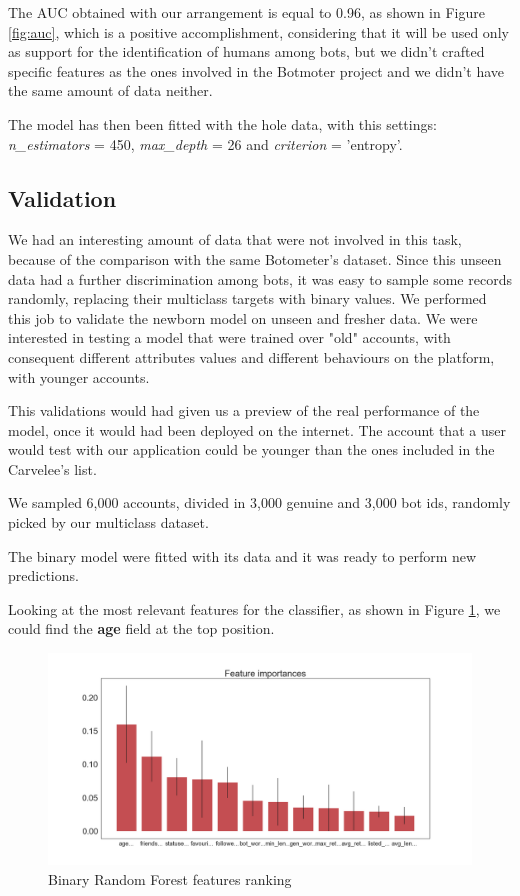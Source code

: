 The AUC obtained with our arrangement is equal to 0.96, as shown in Figure \ref{fig:auc}, which is a positive accomplishment, considering that it will be used only as support for the identification of humans among bots, but we didn't crafted specific features as the ones involved in the Botmoter project and we didn't have the same amount of data neither.

The model has then been fitted with the hole data, with this settings: \textit{ n\_estimators} = 450, \textit{max\_depth} = 26 and \textit{criterion} = 'entropy'.

\subsection{Validation}

We had an interesting amount of data that were not involved in this task, because of the comparison with the same Botometer's dataset. Since this unseen data had a further discrimination among bots, it was easy to sample some records randomly, replacing their multiclass targets with binary values.
We performed this job to validate the newborn model on unseen and fresher data.
We were interested in testing a model that were trained over "old" accounts, with consequent different attributes values and different behaviours on the platform, with younger accounts.

This validations would had given us a preview of the real performance of the model, once it would had been deployed on the internet. The account that a user would test with our application could be younger than the ones included in the Carvelee's list.

We sampled 6,000 accounts, divided in 3,000 genuine and 3,000 bot ids, randomly picked by our multiclass dataset.

The binary model were fitted with its data and it was ready to perform new predictions.

Looking at the most relevant features for the classifier, as shown in Figure \ref{fig:bon_importances}, we could find the \textbf{age} field at the top position.

\begin{figure}[htp!]
	\centering
	\includegraphics[width=\columnwidth]{chapter5/figure/bon_importances.png}
	\caption{Binary Random Forest features ranking}
	\label{fig:bon_importances}
\end{figure}

